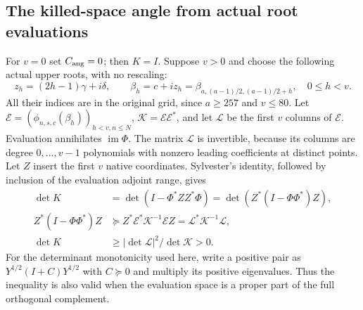 \subsection{The killed-space angle from actual root evaluations}
For $v=0$ set $C_{\rm ang}=0$; then $K=I$. Suppose $v>0$ and choose
the following actual upper roots, with no rescaling:
\[
z_h=(2h-1)\gamma+i\delta,\qquad
\beta_h=c+iz_h=\beta_{a,(a-1)/2,(a-1)/2+h},\quad0\le h<v.
\tag{CRP10}
\]
All their indices are in the original grid, since $a\ge257$ and
$v\le80$. Let $\mathcal E=(\phi_{n,s,c}(\beta_h))_{h<v,n\le N}$,
$\mathcal K=\mathcal E\mathcal E^*$, and let $\mathcal L$ be the first
$v$ columns of $\mathcal E$. Evaluation annihilates $\operatorname{im}\Phi$.
The matrix $\mathcal L$ is invertible, because its columns are degree
$0,\ldots,v-1$ polynomials with nonzero leading coefficients at distinct
points. Let $Z$ insert the first $v$ native coordinates. Sylvester's
identity, followed by inclusion of the evaluation adjoint range, gives
\[
\begin{split}
\det K&=\det(I-\Phi^*ZZ^*\Phi)
 =\det(Z^*(I-\Phi\Phi^*)Z),\\
Z^*(I-\Phi\Phi^*)Z&\succeq
 Z^*\mathcal E^*\mathcal K^{-1}\mathcal E Z
 =\mathcal L^*\mathcal K^{-1}\mathcal L,\\
\det K&\ge |\det\mathcal L|^2/\det\mathcal K>0.
\end{split}\tag{CRP11}
\]
For the determinant monotonicity used here, write a positive pair as
$Y^{1/2}(I+C)Y^{1/2}$ with $C\succeq0$ and multiply its positive
eigenvalues. Thus the inequality is also valid when the evaluation
space is a proper part of the full orthogonal complement.

